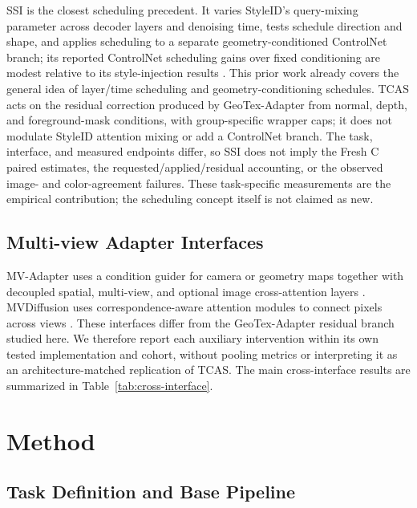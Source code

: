 \documentclass[times,twocolumn,final]{elsarticle}
\providecommand{\DIFadd}[1]{{\protect\color{blue} \sf #1}} %
\providecommand{\DIFaddbegin}{} %
\providecommand{\DIFaddend}{} %
\begin{document}
  \DIFaddbegin \DIFadd{SSI is the closest scheduling precedent. It varies StyleID's query-mixing parameter across decoder layers and denoising time, tests schedule direction and shape, and applies scheduling to a separate }\DIFaddend geometry-conditioned   \DIFaddbegin \DIFadd{ControlNet branch; its reported ControlNet scheduling gains over fixed conditioning are modest relative to its style-injection results \cite{kulkarni2026ssi}. This prior work already covers the general idea of layer/time scheduling and geometry-conditioning schedules. TCAS acts on the residual correction produced by GeoTex-Adapter from normal, depth, and foreground-mask conditions, with group-specific wrapper caps; it does not modulate StyleID attention mixing or add a ControlNet branch. The task, interface, and measured endpoints differ, so SSI does not imply the Fresh C paired estimates, the requested/applied/residual accounting, or the observed image- and color-agreement failures. These task-specific measurements are the empirical contribution; the scheduling concept itself is not claimed as new}\DIFaddend .

  \DIFaddbegin \subsection{Multi-view Adapter Interfaces}
\label{subsec:mvinterfaces}

\DIFadd{MV-Adapter uses a condition guider for camera or geometry maps together with decoupled spatial, multi-view, and optional image cross-attention layers \cite{huang2024mvadapter}. MVDiffusion uses correspondence-aware attention modules to connect pixels across views \cite{tang2023mvdiffusion}. These interfaces differ from the GeoTex-Adapter residual branch studied here. We therefore report each auxiliary intervention within its own tested implementation and cohort, without pooling metrics or interpreting it as an architecture-matched replication of TCAS. The main cross-interface results are summarized in Table~\ref{tab:cross-interface}}\DIFaddend .

\section{Method}
\label{sec:method}

\subsection{Task Definition and Base Pipeline}
\label{subsec:task}
\end{document}
